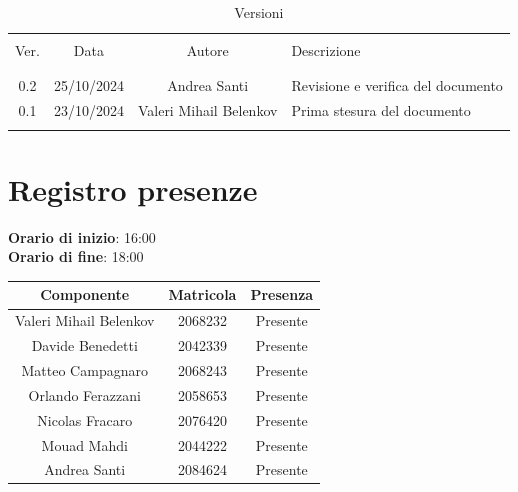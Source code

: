 \documentclass[italian, 12pt]{article}
\begin{document}
\pagestyle{mystyle}


\begin{table}[!h]
	\caption{Versioni}
	\begin{center}
		\begin{tabular}{ c c c p{9cm}}
			\hline \\[-2ex]
			Ver. & Data & Autore & Descrizione \\
			\\[-2ex] \hline \\[-1.5ex]
            0.2 & 25/10/2024 & Andrea Santi & Revisione e verifica del documento \\
			0.1 & 23/10/2024 & Valeri Mihail Belenkov & Prima stesura del documento\\
			\\[-1.5ex] \hline
		\end{tabular}
	\end{center}
\end{table}


\tableofcontents
\newpage


\section{Registro presenze}

\textbf{Orario di inizio}: 16:00\\
\textbf{Orario di fine}: 18:00\\


\begin{flushleft}
	\begin{table}[!h]
	\begin{tabular}{ |c|c|c| } 
		\hline
		\textbf{Componente} & \textbf{Matricola} & \textbf{Presenza} \\
  \hline 
		Valeri Mihail Belenkov & 2068232 & Presente \\
		Davide Benedetti 	& 2042339 & Presente \\
		Matteo Campagnaro	& 2068243 & Presente \\
		Orlando Ferazzani 	& 2058653 & Presente \\
		Nicolas Fracaro 	& 2076420 & Presente \\
		Mouad Mahdi		    & 2044222 & Presente \\ 
		Andrea Santi 	    & 2084624 & Presente \\
		\hline
	\end{tabular}
	\end{table}
	\end{flushleft}
\end{document}
